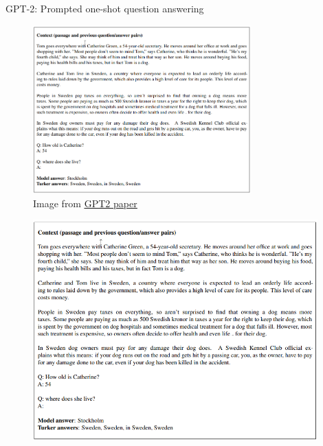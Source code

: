\documentclass[12pt,aspectratio=169,handout]{beamer}
\begin{document}
\begin{frame}{GPT-2: Prompted one-shot question answering}
	\begin{figure}[h]
		\includegraphics[height=6.5cm]{gpt2-prompting-qa}
		\caption*{Image from \href{https://cdn.openai.com/better-language-models/language_models_are_unsupervised_multitask_learners.pdf}{\underline{GPT2 paper}}}
	\end{figure}
\end{frame}

\begin{frame}
	\begin{figure}[h]
		\includegraphics[height=8.5cm]{gpt2-prompting-qa}
	\end{figure}
\end{frame}
\end{document}
